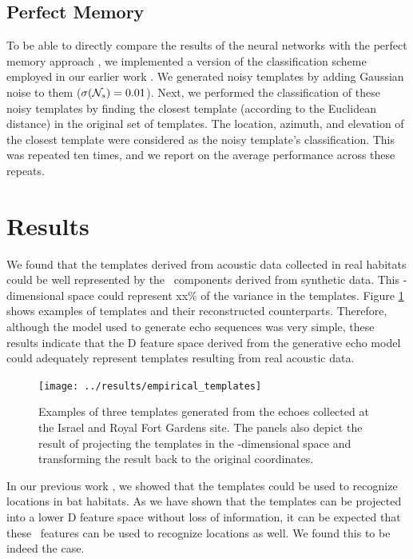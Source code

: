\documentclass[preprint,5p]{elsarticle}
\begin{document}
\subsection{Perfect Memory}

To be able to directly compare the results of the neural networks with the perfect memory approach \citep{Baddeley2012}, we implemented a version of the classification scheme employed in our earlier work \citep{Vanderelst2016}. We generated noisy templates by adding Gaussian noise to them ($\sigma(\mathcal{N}_s) = 0.01$). Next, we performed the classification of these noisy templates by finding the closest template (according to the Euclidean distance) in the original set of templates. The location, azimuth, and elevation of the closest template were considered as the noisy template's classification. This was repeated ten times, and we report on the average performance across these repeats.

\section{Results}

We found that the templates derived from acoustic data collected in real habitats could be well represented by the \pca\ components derived from synthetic data. This \pca-dimensional space could represent xx\% of the variance in the templates. Figure \ref{fig:empiricaltemplates} shows examples of templates and their reconstructed counterparts. Therefore, although the model used to generate echo sequences was very simple, these results indicate that the \pca D feature space derived from the generative echo model could adequately represent templates resulting from real acoustic data.

\begin{figure}[tb]
	\centering
	\texttt{[image: ../results/empirical\_templates]}
	\caption{Examples of three templates generated from the echoes collected at the Israel and Royal Fort Gardens site. The panels also depict the result of projecting the templates in the 
		\pca-dimensional space and transforming the result back to the original coordinates.}
	\label{fig:empiricaltemplates}
\end{figure}

In our previous work \citep{Vanderelst2016}, we showed that the templates could be used to recognize locations in bat habitats. As we have shown that the templates can be projected into a lower \pca D feature space without loss of information, it can be expected that these \pca\ features can be used to recognize locations as well. We found this to be indeed the case.
\end{document}
